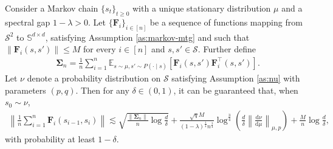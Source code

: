 \medskip
\begin{customcorollary}\label{thm:matrix-bernstein-mtg}
Consider a Markov chain $\{s_t\}_{t \geq 0}$ with a unique stationary distribution $\mu$ and a spectral gap $1-\lambda > 0$. Let $\{\bm{F}_i\}_{i \in [n]}$ be a sequence of functions mapping from  $\mathcal{S}^2$ to $\mathbb{S}^{d \times d}$, satisfying Assumption \ref{as:markov-mtg} and such that $\|\bm{F}_i(s,s')\| \leq M$ for every $i \in [n]$ and $s,s' \in \mathcal{S}$. Further define
\begin{align}
\bm{\Sigma}_n = \frac{1}{n} \sum_{i=1}^n \mathbb{E}_{s \sim \mu, s' \sim P(\cdot \mid s)}[\bm{F}_i(s,s')\bm{F}_i^\top(s,s')].
\end{align} 
Let $\nu$ denote a probability distribution on $\mathcal{S}$  satisfying Assumption \ref{as:nu} with parameters $(p,q)$.
Then for any $\delta \in (0,1)$, it can be guaranteed that, when $s_0 \sim \nu$,
\begin{align}\label{eq:matrix-Bernstein}
\left\|\frac{1}{n}\sum_{i=1}^n \bm{F}_i(s_{i-1},s_i)\right\|  \lesssim \sqrt{\frac{\|\bm{\Sigma}_n\|}{n}\log \frac{d}{\delta}}+\frac{\sqrt{q}M}{(1-\lambda)^{\frac{1}{4}} n^{\frac{3}{4}}} \log^{\frac{3}{4}} \left(\frac{d}{\delta}\left\|\frac{\mathrm{d}\nu}{\mathrm{d}\mu}\right\|_{\mu,p}\right) + \frac{M}{n} \log \frac{d}{\delta},
\end{align}
with probability at least $1-\delta$.
\end{customcorollary}
\medskip

